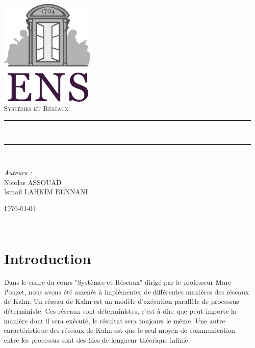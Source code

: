 \documentclass[a4paper, 12pt, twoside]{report}
\newcommand{\HRule}{\rule{\linewidth}{0.5mm}}
\begin{document}

\begin{titlepage}
\begin{center}

\includegraphics[width=0.35\textwidth]{./ENS_Logo.png}~\\[1cm]

\textsc{\Large Systèmes et Réseaux}\\[0.5cm]

\HRule \\[0.4cm{ \huge \bfseries Réseaux de Kahn\\[0.4cm]}]

\HRule \\[1.5cm]
\end{center}

\begin{minipage}{0.4\textwidth}
\begin{flushleft} \large
\emph{Auteurs :}\\
Nicolas ASSOUAD\\
Ismail LAHKIM BENNANI
\end{flushleft}
\end{minipage}

\begin{center}
\vfill
{\large \today}

\end{center}
\end{titlepage}

\newpage~
\newpage~

\section*{Introduction}

Dans le cadre du cours "Systèmes et Réseaux" dirigé par 
le professeur Marc Pouzet, nous avons été amenés à implémenter de différentes manières des réseaux de Kahn. 
Un réseau de Kahn est un modèle d'exécution parallèle de processus déterministe. Ces réseaux sont déterministes, c'est 
à dire que peut importe la manière dont il sera exécuté, le résultat sera toujours le même. Une autre caractéristique 
des réseaux de Kahn est que le seul moyen de communication entre les processus sont des files de longueur 
théorique infinie.\\
\end{document}
